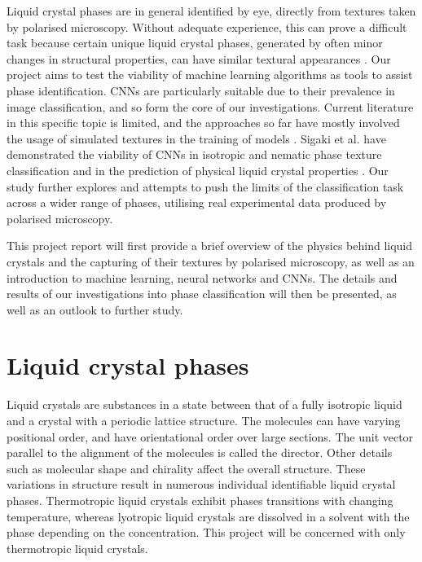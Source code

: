 \documentclass[12pt]{article}
\begin{document}
Liquid crystal phases are in general identified by eye, directly from textures taken by polarised microscopy. Without adequate experience, this can prove a difficult task because certain unique liquid crystal phases, generated by often minor changes in structural properties, can have similar textural appearances \cite{Dierking03}. Our project aims to test the viability of machine learning algorithms as tools to assist phase identification. CNNs are particularly suitable due to their prevalence in image classification, and so form the core of our investigations. Current literature in this specific topic is limited, and the approaches so far have mostly involved the usage of simulated textures in the training of models \cite{Sigaki20, Minor20}. Sigaki et al. have demonstrated the viability of CNNs in isotropic and nematic phase texture classification and in the prediction of physical liquid crystal properties \cite{Sigaki20}. Our study further explores and attempts to push the limits of the classification task across a wider range of phases, utilising real experimental data produced by polarised microscopy.

This project report will first provide a brief overview of the physics behind liquid crystals and the capturing of their textures by polarised microscopy, as well as an introduction to machine learning, neural networks and CNNs. The details and results of our investigations into phase classification will then be presented, as well as an outlook to further study.
\section{Liquid crystal phases}
Liquid crystals are substances in a state between that of a fully isotropic liquid and a crystal with a periodic lattice structure. The molecules can have varying positional order, and have orientational order over large sections. The unit vector parallel to the alignment of the molecules is called the director. Other details such as molecular shape and chirality affect the overall structure. These variations in structure result in numerous individual identifiable liquid crystal phases. Thermotropic liquid crystals exhibit phases transitions with changing temperature, whereas lyotropic liquid crystals are dissolved in a solvent with the phase depending on the concentration. This project will be concerned with only thermotropic liquid crystals. 
\end{document}
